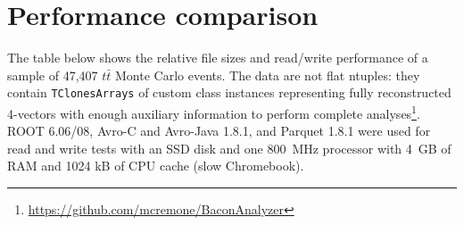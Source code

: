 \documentclass{article}
\begin{document}
\section*{Performance comparison}

The table below shows the relative file sizes and read/write performance of a sample of 47,407 $t\bar{t}$ Monte Carlo events. The data are not flat ntuples: they contain {\tt TClonesArrays} of custom class instances representing fully reconstructed 4-vectors with enough auxiliary information to perform complete analyses\footnote{\url{https://github.com/mcremone/BaconAnalyzer}}. ROOT 6.06/08, Avro-C and Avro-Java 1.8.1, and Parquet 1.8.1 were used for read and write tests with an SSD disk and one 800~MHz processor with 4~GB of RAM and 1024 kB of CPU cache (slow Chromebook).

\vspace{-0.4 cm}
\end{document}
